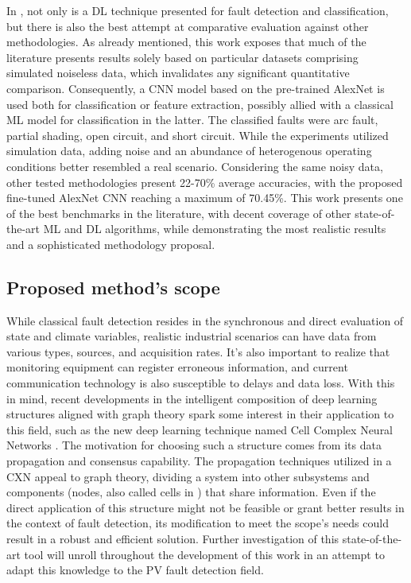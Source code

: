 In \cite{Aziz2020}, not only is a DL technique presented for fault detection and classification, but there is also the best attempt at comparative evaluation against other methodologies. As already mentioned, this work exposes that much of the literature presents results solely based on particular datasets comprising simulated noiseless data, which invalidates any significant quantitative comparison. Consequently, a CNN model based on the pre-trained AlexNet \cite{Krizhevsky2012} is used both for classification or feature extraction, possibly allied with a classical ML model for classification in the latter. The classified faults were arc fault, partial shading, open circuit, and short circuit. While the experiments utilized simulation data, adding noise and an abundance of heterogenous operating conditions better resembled a real scenario. Considering the same noisy data, other tested methodologies present 22-70\% average accuracies, with the proposed fine-tuned AlexNet CNN reaching a maximum of 70.45\%. This work presents one of the best benchmarks in the literature, with decent coverage of other state-of-the-art ML and DL algorithms, while demonstrating the most realistic results and a sophisticated methodology proposal.

\subsection{Proposed method's scope}

While classical fault detection resides in the synchronous and direct evaluation of state and climate variables, realistic industrial scenarios can have data from various types, sources, and acquisition rates. It's also important to realize that monitoring equipment can register erroneous information, and current communication technology is also susceptible to delays and data loss. With this in mind, recent developments in the intelligent composition of deep learning structures aligned with graph theory spark some interest in their application to this field, such as the new deep learning technique named Cell Complex Neural Networks \cite{Hajij2020}. The motivation for choosing such a structure comes from its data propagation and consensus capability. The propagation techniques utilized in a CXN appeal to graph theory, dividing a system into other subsystems and components (nodes, also called cells in \cite{Hajij2020}) that share information. Even if the direct application of this structure might not be feasible or grant better results in the context of fault detection, its modification to meet the scope's needs could result in a robust and efficient solution. Further investigation of this state-of-the-art tool will unroll throughout the development of this work in an attempt to adapt this knowledge to the PV fault detection field.

